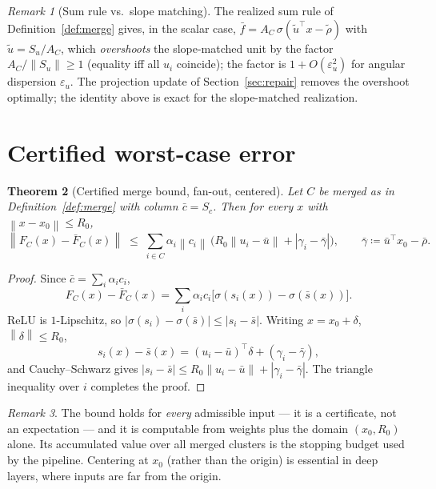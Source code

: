 \documentclass[11pt]{article}
\newtheorem{theorem}{Theorem}[section]
\theoremstyle{remark}
\newtheorem{remark}[theorem]{Remark}
\newcommand{\relu}{\sigma}
\newcommand{\norm}[1]{\left\lVert #1 \right\rVert}
\newcommand{\abs}[1]{\left\lvert #1 \right\rvert}
\begin{document}
\begin{remark}[Sum rule vs.\ slope matching]\label{rem:overshoot}
The realized sum rule of Definition~\ref{def:merge} gives, in the scalar
case, $\bar f = A_C\,\relu(\tilde u^\top x - \tilde\rho)$ with
$\tilde u = S_u/A_C$, which \emph{overshoots} the slope-matched unit by the
factor $A_C/\norm{S_u} \ge 1$ (equality iff all $u_i$ coincide); the factor
is $1 + O(\varepsilon_u^2)$ for angular dispersion $\varepsilon_u$. The
projection update of Section~\ref{sec:repair} removes the overshoot
optimally; the identity above is exact for the slope-matched realization.
\end{remark}

\section{Certified worst-case error}\label{sec:certified}

\begin{theorem}[Certified merge bound, fan-out, centered]\label{thm:bound}
Let $C$ be merged as in Definition~\ref{def:merge} with column
$\bar c = S_c$. Then for every $x$ with $\norm{x - x_0}\le R_0$,
\[
  \norm{F_C(x) - \bar F_C(x)}
  \;\le\; \sum_{i\in C} \alpha_i \norm{c_i}\,
  \Big( R_0 \norm{u_i - \bar u} + \abs{\gamma_i - \bar\gamma} \Big),
  \qquad \bar\gamma \coloneqq \bar u^\top x_0 - \bar\rho .
\]
\end{theorem}

\begin{proof}
Since $\bar c = \sum_i \alpha_i c_i$,
\[
  F_C(x) - \bar F_C(x)
  = \sum_i \alpha_i c_i\big[\relu(s_i(x)) - \relu(\bar s(x))\big].
\]
ReLU is $1$-Lipschitz, so $\abs{\relu(s_i)-\relu(\bar s)} \le
\abs{s_i - \bar s}$. Writing $x = x_0 + \delta$, $\norm{\delta}\le R_0$,
\[
  s_i(x) - \bar s(x) = (u_i-\bar u)^\top \delta + (\gamma_i - \bar\gamma),
\]
and Cauchy--Schwarz gives $\abs{s_i - \bar s} \le R_0\norm{u_i - \bar u} +
\abs{\gamma_i - \bar\gamma}$. The triangle inequality over $i$ completes the
proof.
\end{proof}

\begin{remark}
The bound holds for \emph{every} admissible input --- it is a certificate,
not an expectation --- and it is computable from weights plus the domain
$(x_0,R_0)$ alone. Its accumulated value over all merged clusters is the
stopping budget used by the pipeline. Centering at $x_0$ (rather than the
origin) is essential in deep layers, where inputs are far from the origin.
\end{remark}
\end{document}
